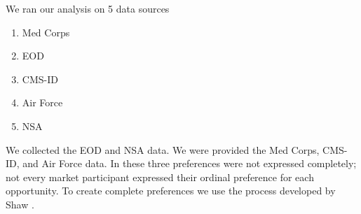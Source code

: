 We ran our analysis on 5 data sources

\begin{enumerate}

\item Med Corps

\item EOD

\item CMS-ID

\item Air Force

\item NSA

\end{enumerate}

We collected the EOD and NSA data. We were provided the Med Corps, CMS-ID, and Air Force data. In these three preferences were not expressed completely; not every market participant expressed their ordinal preference for each opportunity. To create complete preferences we use the process developed by Shaw \cite{2019_Shaw}.